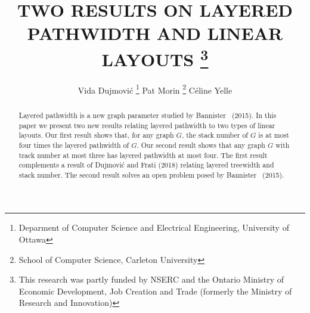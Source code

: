 \documentclass{patmorin}
\title{\MakeUppercase{Two Results on Layered Pathwidth and Linear Layouts}%
  \thanks{This research was partly funded by NSERC and the Ontario Ministry of Economic Development, Job Creation and Trade (formerly the Ministry of Research and Innovation)}}
\author{Vida Dujmović%
  \thanks{Deparment of Computer Science and Electrical Engineering, University of Ottawa}\qquad
  Pat Morin%
  \thanks{School of Computer Science, Carleton University}\qquad 
  Céline Yelle\footnotemark[2]}
\date{}
\begin{document}
%
%
%

%
\maketitle              %
%


\begin{abstract}
  Layered pathwidth is a new graph parameter studied by Bannister \etal\ (2015). In this paper we present two new results relating layered pathwidth to two types of linear layouts.  Our first result shows that, for any graph $G$, the stack number of $G$ is at most four times the layered pathwidth of $G$.   Our second result shows that any graph $G$ with track number at most three has layered pathwidth at most four.  The first result complements a result of Dujmović and Frati (2018) relating layered treewidth and stack number.  The second result solves an open problem posed by Bannister \etal\ (2015).
\end{abstract}
\end{document}
